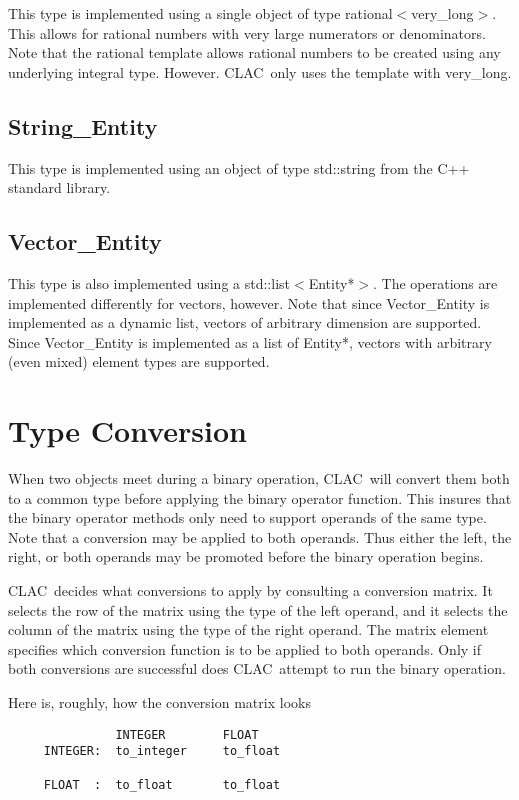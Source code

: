 \documentclass{report}
\newcommand{\CLAC}{CLAC}
\begin{document}
This type is implemented using a single object of type rational$<$very\_long$>$. This allows for rational numbers with very large numerators or denominators. Note that the rational template allows rational numbers to be created using any underlying integral type. However. \CLAC\ only uses the template with very\_long.

\subsection{String\_Entity}

This type is implemented using an object of type std::string from the C++ standard library.

\subsection{Vector\_Entity}

This type is also implemented using a std::list$<$Entity*$>$. The operations are implemented differently for vectors, however. Note that since Vector\_Entity is implemented as a dynamic list, vectors of arbitrary dimension are supported. Since Vector\_Entity is implemented as a list of Entity*, vectors with arbitrary (even mixed) element types are supported.

\section{Type Conversion}

When two objects meet during a binary operation, \CLAC\ will convert them both to a common type before applying the binary operator function. This insures that the binary operator methods only need to support operands of the same type. Note that a conversion may be applied to both operands. Thus either the left, the right, or both operands may be promoted before the binary operation begins.

\CLAC\ decides what conversions to apply by consulting a conversion matrix. It selects the row of the matrix using the type of the left operand, and it selects the column of the matrix using the type of the right operand. The matrix element specifies which conversion function is to be applied to both operands. Only if both conversions are successful does \CLAC\ attempt to run the binary operation.

Here is, roughly, how the conversion matrix looks

%
%
\begin{verbatim}
               INTEGER        FLOAT
     INTEGER:  to_integer     to_float

     FLOAT  :  to_float       to_float
\end{verbatim}
\end{document}
